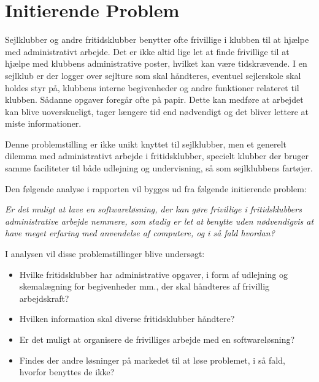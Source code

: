 \section{Initierende Problem}
Sejlklubber og andre fritidsklubber benytter ofte frivillige i klubben til at hjælpe med administrativt arbejde. Det er ikke altid lige let at finde frivillige til at hjælpe med klubbens administrative poster, hvilket kan være tidskrævende. I en sejlklub er der logger over sejlture som skal håndteres, eventuel sejlerskole skal holdes styr på, klubbens interne begivenheder og andre funktioner relateret til klubben. Sådanne opgaver foregår ofte på papir. Dette kan medføre at arbejdet kan blive uoverskueligt, tager længere tid end nødvendigt og det bliver lettere at miste informationer.

Denne problemstilling er ikke unikt knyttet til sejlklubber, men et generelt dilemma med administrativt arbejde i fritidsklubber, specielt klubber der bruger samme faciliteter til både udlejning og undervisning, så som sejlklubbens fartøjer. 

Den følgende analyse i rapporten vil bygges ud fra følgende initierende problem:

\textit{Er det muligt at lave en softwareløsning, der kan gøre frivillige i fritidsklubbers administrative arbejde nemmere, som stadig er let at benytte uden nødvendigvis at have meget erfaring med anvendelse af computere, og i så fald hvordan?}

I analysen vil disse problemstillinger blive undersøgt:
\begin{itemize}
\item Hvilke fritidsklubber har administrative opgaver, i form af udlejning og skemalægning for begivenheder mm., der skal håndteres af frivillig arbejdskraft?
\item Hvilken information skal diverse fritidsklubber håndtere?
\item Er det muligt at organisere de frivilliges arbejde med en softwareløsning?
\item Findes der andre løsninger på markedet til at løse problemet, i så fald, hvorfor benyttes de ikke?
\end{itemize}